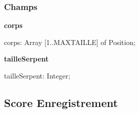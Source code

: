\documentclass{report}
\newif\ifpdf
\begin{document}
\subsubsection*{\large{\textbf{Champs}}\normalsize\hspace{1ex}\hfill}
\begin{list}{}{
\setlength{\itemindent}{0cm}
\setlength{\listparindent}{0cm}
\setlength{\leftmargin}{\evensidemargin}
\addtolength{\leftmargin}{\tmplength}
\settowidth{\labelsep}{X}
\addtolength{\leftmargin}{\labelsep}
\setlength{\labelwidth}{\tmplength}
}
\label{Types.Serpent-corps}
\item[\textbf{corps}\hfill]
\ifpdf
\begin{flushleft}
\fi
\begin{ttfamily}
corps: Array [1..MAXTAILLE] of Position;\end{ttfamily}

\ifpdf
\end{flushleft}
\fi


\par  \label{Types.Serpent-tailleSerpent}
\item[\textbf{tailleSerpent}\hfill]
\ifpdf
\begin{flushleft}
\fi
\begin{ttfamily}
tailleSerpent: Integer;\end{ttfamily}

\ifpdf
\end{flushleft}
\fi


\par  \end{list}
\ifpdf
\subsection*{\large{\textbf{Score Enregistrement}}\normalsize\hspace{1ex}\hrulefill}
\else
\subsection*{Score Enregistrement}
\fi
\label{Types.Score}
\end{document}
